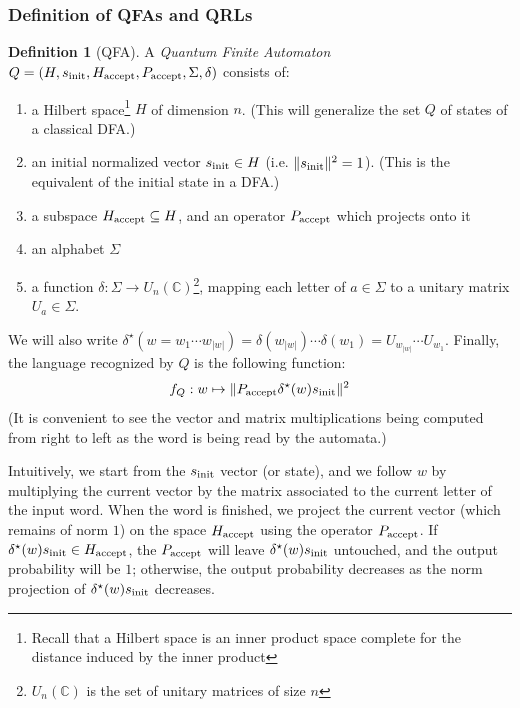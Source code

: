 \documentclass[12pt,a4paper]{article}
\theoremstyle{plain}
\theoremstyle{definition}
\newtheorem*{definition}{Definition}
\begin{document}
\subsubsection{Definition of QFAs and QRLs}
\begin{definition}[QFA]
    A \emph{Quantum Finite Automaton} $Q=(H, s_{\textnormal{init}}, H_{\textnormal{accept}}, P_{\textnormal{accept}}, \Sigma, \delta)$ consists of:
    \begin{enumerate}[label=--, noitemsep]
        \item a Hilbert space\footnote{Recall that a Hilbert space is an inner product space complete for the distance induced by the inner product} $H$ of dimension $n$. (This will generalize the set $Q$ of states of a classical DFA.)
        \item an initial normalized vector $s_{\textnormal{init}}\in H$ (i.e. $\|s_{\textnormal{init}}\|^2=1$). (This is the equivalent of the initial state in a DFA.)
        \item a subspace $H_{\textnormal{accept}} \subseteq H$, and an operator $P_{\textnormal{accept}}$ which projects onto it
        \item an alphabet $\Sigma$
        \item a function $\delta : \Sigma \to U_n(\mathbb{C})$\footnote{$U_n(\mathbb{C})$ is the set of unitary matrices of size $n$}, mapping each letter of $a\in\Sigma$ to a unitary matrix $U_a\in\Sigma$.
    \end{enumerate}
    
    We will also write $\delta^\star(w=w_1\cdots w_{|w|}) = \delta(w_{|w|})\cdots \delta(w_1) = U_{w_{|w|}}\cdots U_{w_1}$. Finally, the language recognized by $Q$ is the following function:
    \begin{equation*}
        f_Q : w \mapsto \|P_{\textnormal{accept}}\delta^\star(w)s_{\textnormal{init}}\|^2
    \end{equation*}
    (It is convenient to see the vector and matrix multiplications being computed from right to left as the word is being read by the automata.)
\end{definition}

Intuitively, we start from the $s_{\textnormal{init}}$ vector (or state), and we follow $w$ by multiplying the current vector by the matrix associated to the current letter of the input word. When the word is finished, we project the current vector (which remains of norm $1$) on the space $H_{\textnormal{accept}}$ using the operator $P_{\textnormal{accept}}$. If $\delta^\star(w)s_{\textnormal{init}}\in H_{\textnormal{accept}}$, the $P_{\textnormal{accept}}$ will leave $\delta^\star(w)s_{\textnormal{init}}$ untouched, and the output probability will be $1$; otherwise, the output probability decreases as the norm projection of $\delta^\star(w)s_{\textnormal{init}}$ decreases.
\end{document}
